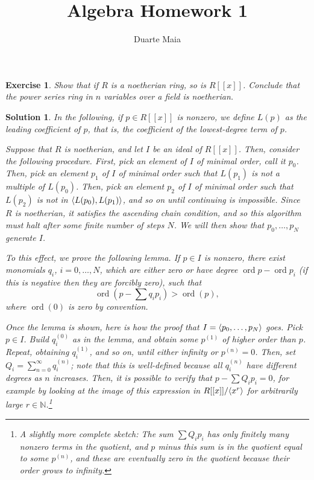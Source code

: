 \documentclass{article}
\title{Algebra Homework 1}
\author{Duarte Maia}
\newtheorem{ex}{Exercise}
\theoremstyle{nonumberplain}
\newtheorem{sol}{Solution}
\newcommand{\N}{\mathbb{N}}
\DeclareMathOperator{\ord}{ord}
\DeclarePairedDelimiter{\braket}{\langle}{\rangle}
\begin{document}
\maketitle

\begin{ex}
Show that if $R$ is a noetherian ring, so is $R[[x]]$. Conclude that the power series ring in $n$ variables over a field is noetherian.
\end{ex}

\begin{sol}
In the following, if $p \in R[[x]]$ is nonzero, we define $L(p)$ as the leading coefficient of $p$, that is, the coefficient of the lowest-degree term of $p$.

Suppose that $R$ is noetherian, and let $I$ be an ideal of $R[[x]]$. Then, consider the following procedure. First, pick an element of $I$ of minimal order, call it $p_0$. Then, pick an element $p_1$ of $I$ of minimal order such that $L(p_1)$ is not a multiple of $L(p_0)$. Then, pick an element $p_2$ of $I$ of minimal order such that $L(p_2)$ is not in $\braket{L(p_0),L(p_1)}$, and so on until continuing is impossible. Since $R$ is noetherian, it satisfies the ascending chain condition, and so this algorithm must halt after some finite number of steps $N$. We will then show that $p_0, \dots, p_N$ generate $I$.

To this effect, we prove the following lemma. If $p \in I$ is nonzero, there exist monomials $q_i$, $i = 0, \dots, N$, which are either zero or have degree $\ord p - \ord p_i$ (if this is negative then they are forcibly zero), such that
\begin{equation}
\ord(p - \sum q_i p_i) > \ord(p),
\end{equation}
where $\ord(0)$ is zero by convention.

Once the lemma is shown, here is how the proof that $I = \braket{p_0, \dots, p_N}$ goes. Pick $p \in I$. Build $q_i^(0)$ as in the lemma, and obtain some $p^(1)$ of higher order than $p$. Repeat, obtaining $q_i^(1)$, and so on, until either infinity or $p^(n) = 0$. Then, set $Q_i = \sum_{n=0}^\infty q_i^(n)$; note that this is well-defined because all $q_i^(n)$ have different degrees as $n$ increases. Then, it is possible to verify that $p - \sum Q_i p_i = 0$, for example by looking at the image of this expression in $R[[x]]/\braket{x^r}$ for arbitrarily large $r \in \N$.\footnote{A slightly more complete sketch: The sum $\sum Q_i p_i$ has only finitely many nonzero terms in the quotient, and $p$ minus this sum is in the quotient equal to some $p^(n)$, and these are eventually zero in the quotient because their order grows to infinity.}


\end{sol}
\end{document}
